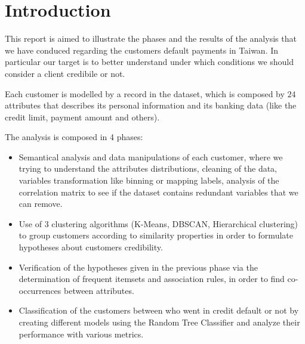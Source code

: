 \chapter{Introduction}


This report is aimed to illustrate the phases and the results of the analysis that we have conduced regarding the customers default payments in Taiwan. 
In particular our target is to better understand under which conditions we should consider a client credibile or not.

\medskip

Each customer is modelled by a record in the dataset, which is composed by $24$ attributes that describes its personal information and its banking data (like the credit limit, payment amount and others).

\medskip

The analysis is composed in 4 phases:

\begin{itemize}
  \item Semantical analysis and data manipulations of each customer, where we trying to understand the attributes distributions, cleaning of the data, variables transformation like binning or mapping labels, analysis of the correlation matrix to see if the dataset contains redundant variables that we can remove.
  
  \item Use of 3 clustering algorithms (K-Means, DBSCAN, Hierarchical clustering) to group customers according to similarity properties in order to formulate hypotheses about customers credibility.

  \item Verification of the hypotheses given in the previous phase via the determination of frequent itemsets and association rules, in order to find co-occurrences between attributes.

  \item Classification of the customers between who went in credit default or not  by creating different models using the Random Tree Classifier and analyze their performance with various metrics.
\end{itemize}
